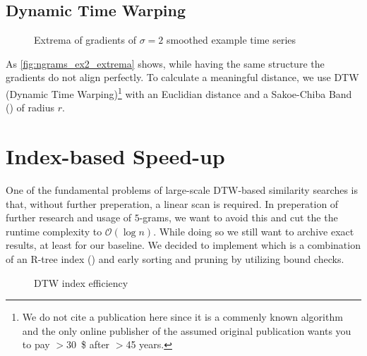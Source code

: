 \subsection{Dynamic Time Warping}
\label{ssec:baseline:sim:dtw}

\begin{figure}
    \centering
    
    \caption{Extrema of gradients of $\sigma = 2$ smoothed example time series}
    \label{fig:ngrams_ex2_extrema}
\end{figure}

As \autoref{fig:ngrams_ex2_extrema} shows, while having the same structure the gradients do not align perfectly. To calculate a meaningful distance, we use DTW (Dynamic Time Warping)\footnote{We do not cite a publication here since it is a commenly known algorithm and the only online publisher of the assumed original publication wants you to pay $>$\SI{30}{\$} after $>$\num{45} years.} with an Euclidian distance and a Sakoe-Chiba Band (\cite{sakoe}) of radius $r$.

\section{Index-based Speed-up}
\label{sec:baseline:speed}

One of the fundamental problems of large-scale DTW-based similarity searches is that, without further preperation, a linear scan is required. In preperation of further research and usage of $5$-grams, we want to avoid this and cut the the runtime complexity to $\mathcal{O}(\log{n})$. While doing so we still want to archive exact results, at least for our baseline. We decided to implement \cite{LB_Keogh} which is a combination of an R-tree index (\cite{rtree}) and early sorting and pruning by utilizing bound checks.

\begin{figure}
    \centering
    
    \caption{DTW index efficiency}
    \label{fig:dtw_index}
\end{figure}

